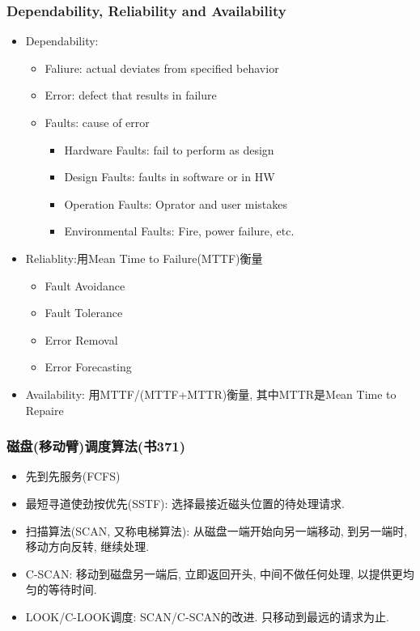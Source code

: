 \documentclass[a4paper, UTF8]{article}
\begin{document}
\subsubsection{Dependability, Reliability and Availability}
\begin{itemize}
\item Dependability:
	\begin{itemize}
	\item Faliure: actual deviates from specified behavior
	\item Error: defect that results in failure
	\item Faults: cause of error
		\begin{itemize}
		\item Hardware Faults: fail to perform as design
		\item Design Faults: faults in software or in HW
		\item Operation Faults: Oprator and user mistakes
		\item Environmental Faults: Fire, power failure, etc.
		\end{itemize}
	\end{itemize}
\item Reliablity:用Mean Time to Failure(MTTF)衡量
	\begin{itemize}
	\item Fault Avoidance
	\item Fault Tolerance
	\item Error Removal
	\item Error Forecasting
	\end{itemize}
\item Availability: 用MTTF/(MTTF+MTTR)衡量, 其中MTTR是Mean Time to Repaire
\end{itemize}

\subsubsection{磁盘(移动臂)调度算法(书371)}
\begin{itemize}
\item 先到先服务(FCFS)
\item 最短寻道使劲按优先(SSTF): 选择最接近磁头位置的待处理请求.
\item 扫描算法(SCAN, 又称电梯算法): 从磁盘一端开始向另一端移动, 到另一端时, 移动方向反转, 继续处理.
\item C-SCAN: 移动到磁盘另一端后, 立即返回开头, 中间不做任何处理, 以提供更均匀的等待时间.
\item LOOK/C-LOOK调度: SCAN/C-SCAN的改进. 只移动到最远的请求为止.
\end{itemize}
\end{document}
